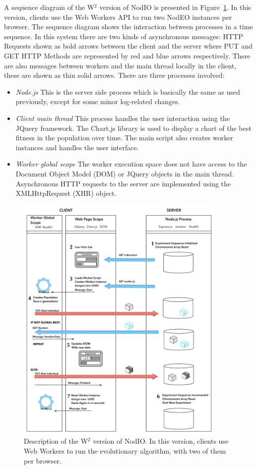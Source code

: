 \documentclass[journal,onecolumn]{IEEEtran}
\begin{document}
A sequence diagram of the W$^2$ version of {\sf NodIO} is presented
in Figure~\ref{fig:system:w2}. In this version, clients use the Web Workers
API to run two NodEO instances per browser. The sequence diagram shows the
interaction between processes in a time sequence. In this system there are
two kinds of asynchronous messages: HTTP Requests shown as bold arrows between
the client and the server where PUT and GET HTTP Methods are represented by
red and blue arrows respectively. There are also messages between workers and
the main thread locally in the client, these are shown as thin solid arrows.
There are three processes involved:
\begin{itemize}
\item {\em Node.js} This is the server side process which is basically
  the same as used previously, except for some minor log-related
  changes. 
\item {\em Client main thread}  This process handles the user interaction
using the JQuery framework. The Chart.js library is used to display a chart of
the best fitness in the population over time. The main script also creates
worker instances and handles the user interface.
\item {\em Worker global scope} The worker execution space does not have
access to the Document Object Model (DOM) or JQuery objects in the main thread.
Asynchronous HTTP requests to the server are implemented using the
XMLHttpRequest (XHR) object.  
\end{itemize}


%
\begin{figure}[!htb]
\centering
\includegraphics[width=4in]{Algorithm.pdf}
\caption{Description of the W$^2$ version of {\sf NodIO}. In this
  version, clients use Web Workers to run the evolutionary algorithm,
  with two of them per browser.}
\label{fig:system:w2}
\end{figure}
\end{document}

